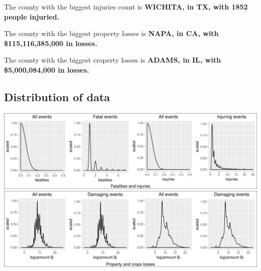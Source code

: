 The county with the biggest injuries count is \textbf{WICHITA, in TX,
with 1852 people injuried.}

The county with the biggest property losses is \textbf{NAPA, in CA, with
\$115,116,385,000 in losses.}

The county with the biggest croperty losses is \textbf{ADAMS, in IL,
with \$5,000,084,000 in losses.}

\subsection{Distribution of data}\label{distribution-of-data}

\includegraphics{readme_files/figure-latex/distribution-1.pdf}
\includegraphics{readme_files/figure-latex/distribution-2.pdf}



